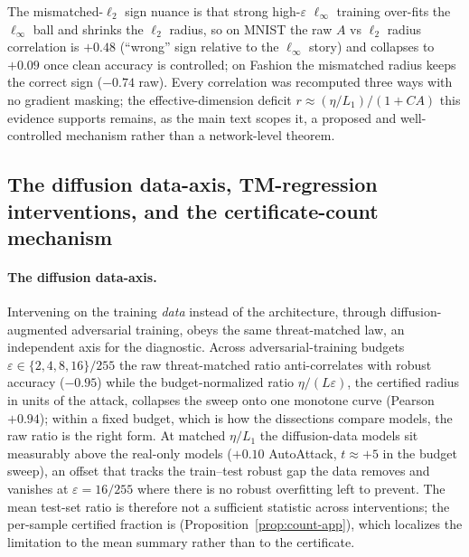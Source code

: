 The mismatched-$\ell_2$ sign nuance is that strong high-$\varepsilon$
$\ell_\infty$ training over-fits the $\ell_\infty$ ball and shrinks the $\ell_2$
radius, so on MNIST the raw $A$ vs $\ell_2$ radius correlation is $+0.48$
(``wrong'' sign relative to the $\ell_\infty$ story) and collapses to $+0.09$
once clean accuracy is controlled; on Fashion the mismatched radius keeps the
correct sign ($-0.74$ raw). Every correlation was recomputed three ways with no
gradient masking; the effective-dimension deficit
$r\approx(\eta/L_1)/(1+CA)$ this evidence supports remains, as the main text
scopes it, a proposed and well-controlled mechanism rather than a network-level
theorem.

\subsection{The diffusion data-axis, TM-regression interventions, and the
certificate-count mechanism}\label{app:extra-full}
\paragraph{The diffusion data-axis.} Intervening on the training \emph{data}
instead of the architecture, through diffusion-augmented adversarial training,
obeys the same threat-matched law, an independent axis for the diagnostic. Across
adversarial-training budgets $\varepsilon\in\{2,4,8,16\}/255$ the raw
threat-matched ratio anti-correlates with robust accuracy ($-0.95$) while the
budget-normalized ratio $\eta/(L\varepsilon)$, the certified radius in units of
the attack, collapses the sweep onto one monotone curve (Pearson $+0.94$); within
a fixed budget, which is how the dissections compare models, the raw ratio is the
right form. At matched $\eta/L_1$ the diffusion-data models sit measurably above
the real-only models ($+0.10$ AutoAttack, $t\approx+5$ in the budget sweep), an
offset that tracks the train--test robust gap the data removes and vanishes at
$\varepsilon=16/255$ where there is no robust overfitting left to prevent. The
mean test-set ratio is therefore not a sufficient statistic across interventions;
the per-sample certified fraction is (Proposition~\ref{prop:count-app}), which
localizes the limitation to the mean summary rather than to the certificate.

